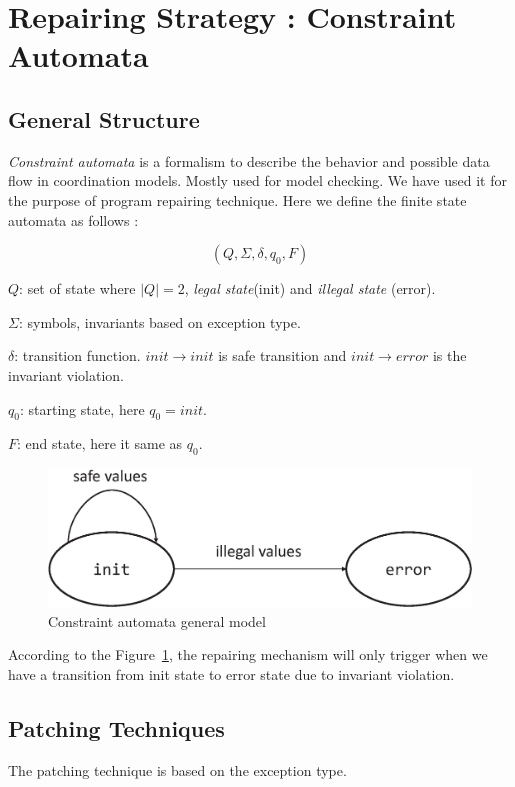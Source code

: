 \section{Repairing Strategy : Constraint Automata}
\label{sec:strgCA}

\subsection{General Structure}
\label{subsec:generalCA}

\emph{Constraint automata} is a formalism to describe the behavior and possible
data flow in coordination models. 
Mostly used for model checking. We have used it for the purpose of program
repairing technique. Here we define the finite state automata as follows :

$$(Q, \Sigma, \delta, q_0, F)$$
\begin{mybullet}
 \item $Q$: set of state where $|Q| = 2$, \emph{legal state}(init) and
\emph{illegal state} (error).
 \item $\Sigma$: symbols, invariants based on exception type.
 \item $\delta$: transition function. $init \rightarrow init$ is safe
transition and $init \rightarrow error$ is the invariant violation.
 \item $q_0$: starting state, here $q_0 = init$.
 \item $F$: end state, here it same as $q_0$.
\end{mybullet}

\begin{figure}[t]
\centering
\includegraphics[scale=.25]{images/automata.eps}
\caption{Constraint automata general model}
\label{fig:automata}
\end{figure}

According to the Figure~\ref{fig:automata}, the repairing mechanism will only
trigger when we have a transition from 
init state to error state due to invariant violation.

\subsection{Patching Techniques}
\label{subsec:patchCA}

The patching technique is based on the exception type. 
